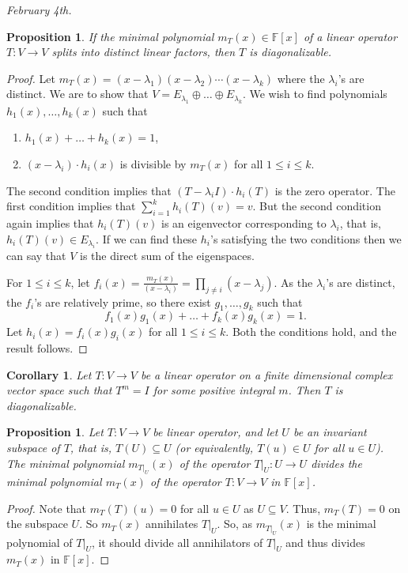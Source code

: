 \documentclass[15pt,a4paper]{book}
\newtheorem{proposition}[theorem]{Proposition}
\newtheorem{corollary}[theorem]{Corollary}
\theoremstyle{definition}
\newcommand{\F}{\mathbb{F}}
\begin{document}
\textit{February 4th.}
\begin{proposition}
    If the minimal polynomial $m_{T}(x) \in \F[x]$ of a linear operator $T: V \to V$ splits into distinct linear factors, then $T$ is diagonalizable.
\end{proposition}
\begin{proof}
    Let $m_{T}(x) = (x-\lambda_{1})(x-\lambda_{2}) \cdots (x-\lambda_{k})$ where the $\lambda_{i}$'s are distinct. We are to show that $V = E_{\lambda_{1}} \oplus \ldots \oplus E_{\lambda_{k}}$. We wish to find polynomials $h_{1}(x), \ldots, h_{k}(x)$ such that
    \begin{enumerate}
        \item $h_{1}(x) + \ldots + h_{k}(x) = 1$,
        \item $(x-\lambda_{i}) \cdot h_{i}(x)$ is divisible by $m_{T}(x)$ for all $1 \leq i \leq k$.
    \end{enumerate}
    The second condition implies that $(T-\lambda_{i}I) \cdot h_{i}(T)$ is the zero operator. The first condition implies that $\sum_{i=1}^{k} h_{i}(T)(v) = v$. But the second condition again implies that $h_{i}(T)(v)$ is an eigenvector corresponding to $\lambda_{i}$, that is, $h_{i}(T)(v) \in E_{\lambda_{i}}$. If we can find these $h_{i}$'s satisfying the two conditions then we can say that $V$ is the direct sum of the eigenspaces.

    For $1 \leq i \leq k$, let $f_{i}(x) = \frac{m_{T}(x)}{(x-\lambda_{i})} = \prod_{j \neq i} (x-\lambda_{j})$. As the $\lambda_{i}$'s are distinct, the $f_{i}$'s are relatively prime, so there exist $g_{1}, \ldots, g_{k}$ such that
    \begin{equation}
        f_{1}(x)g_{1}(x) + \ldots + f_{k}(x) g_{k}(x) = 1.
    \end{equation}
    Let $h_{i}(x) = f_{i}(x) g_{i}(x)$ for all $1 \leq i \leq k$. Both the conditions hold, and the result follows.
\end{proof}

\begin{corollary}
    Let $T:V \to V$ be a linear operator on a finite dimensional complex vector space such that $T^{m} = I$ for some positive integral $m$. Then $T$ is diagonalizable.
\end{corollary}

\begin{proposition}
    Let $T:V \to V$ be  linear operator, and let $U$ be an invariant subspace of $T$, that is, $T(U) \subseteq U$ (or equivalently, $T(u) \in U$ for all $u \in U$). The minimal polynomial $m_{T|_{U}}(x)$ of the operator $T|_{U} : U \to U$ divides the minimal polynomial $m_{T}(x)$ of the operator $T: V \to V$ in $\F[x]$.
\end{proposition}
\begin{proof}
    Note that $m_{T}(T)(u) = 0$ for all $u \in U$ as $U \subseteq V$. Thus, $m_{T}(T) = 0$ on the subspace $U$. So $m_{T}(x)$ annihilates $T|_{U}$. So, as $m_{T|_{U}}(x)$ is the minimal polynomial of $T|_{U}$, it should divide all annihilators of $T|_{U}$ and thus divides $m_{T}(x)$ in $\F[x]$.
\end{proof}
\end{document}
